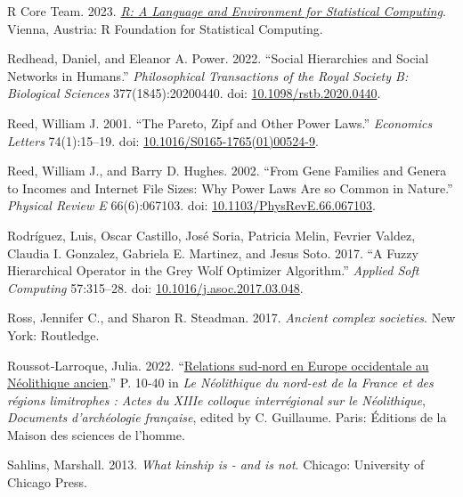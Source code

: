 \documentclass[
  12pt,
]{book}
\newlength{\cslhangindent}
\newlength{\cslentryspacingunit} %
\newenvironment{CSLReferences}[2] %
 {%
  \setlength{\parindent}{0pt}
  \ifodd #1
  \let\oldpar\par
  \def\par{\hangindent=\cslhangindent\oldpar}
  \fi
  \setlength{\parskip}{#2\cslentryspacingunit}
 }%
 {}
\begin{document}
\begin{CSLReferences}{1}{0}
\leavevmode{}%
R Core Team. 2023. \emph{\href{https://www.R-project.org/}{R: A Language and Environment for Statistical Computing}}. Vienna, Austria: R Foundation for Statistical Computing.

\leavevmode{}%
Redhead, Daniel, and Eleanor A. Power. 2022. {``Social Hierarchies and Social Networks in Humans.''} \emph{Philosophical Transactions of the Royal Society B: Biological Sciences} 377(1845):20200440. doi: \href{https://doi.org/10.1098/rstb.2020.0440}{10.1098/rstb.2020.0440}.

\leavevmode{}%
Reed, William J. 2001. {``The Pareto, Zipf and Other Power Laws.''} \emph{Economics Letters} 74(1):15--19. doi: \href{https://doi.org/10.1016/S0165-1765(01)00524-9}{10.1016/S0165-1765(01)00524-9}.

\leavevmode{}%
Reed, William J., and Barry D. Hughes. 2002. {``From Gene Families and Genera to Incomes and Internet File Sizes: Why Power Laws Are so Common in Nature.''} \emph{Physical Review E} 66(6):067103. doi: \href{https://doi.org/10.1103/PhysRevE.66.067103}{10.1103/PhysRevE.66.067103}.

\leavevmode{}%
Rodríguez, Luis, Oscar Castillo, José Soria, Patricia Melin, Fevrier Valdez, Claudia I. Gonzalez, Gabriela E. Martinez, and Jesus Soto. 2017. {``A Fuzzy Hierarchical Operator in the Grey Wolf Optimizer Algorithm.''} \emph{Applied Soft Computing} 57:315--28. doi: \href{https://doi.org/10.1016/j.asoc.2017.03.048}{10.1016/j.asoc.2017.03.048}.

\leavevmode{}%
Ross, Jennifer C., and Sharon R. Steadman. 2017. \emph{Ancient complex societies}. New York: Routledge.

\leavevmode{}%
Roussot‑Larroque, Julia. 2022. {``\href{https://doi.org/10.4000/books.editionsmsh.39018}{Relations sud‑nord en Europe occidentale au Néolithique ancien}.''} P. 10‑40 in \emph{Le Néolithique du nord-est de la France et des régions limitrophes : Actes du XIIIe colloque interrégional sur le Néolithique}, \emph{Documents d'archéologie française}, edited by C. Guillaume. {Paris}: {Éditions de la Maison des sciences de l'homme}.

\leavevmode{}%
Sahlins, Marshall. 2013. \emph{What kinship is - and is not}. Chicago: University of Chicago Press.


\end{CSLReferences}
\end{document}
